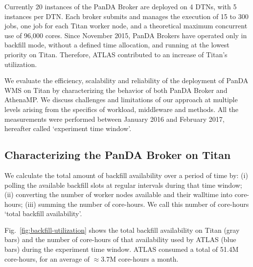\begin{enumerate}
\end{enumerate}
\fi

Currently 20 instances of the PanDA Broker are deployed on 4 DTNs, with
5 instances per DTN\@. Each broker submits and manages the execution of 15 to
300 jobs, one job for each Titan worker node, and a theoretical maximum
concurrent use of 96,000 cores. Since November 2015, PanDA Brokers have
operated only in backfill mode, without a defined time allocation, and
running at the lowest priority on Titan. Therefore, ATLAS contributed to an
increase of Titan's utilization.

We evaluate the efficiency, scalability and reliability of the deployment of
PanDA WMS on Titan by characterizing the behavior of both PanDA Broker and
AthenaMP\@. We discuss challenges and limitations of our approach at multiple
levels arising from the specifics of workload, middleware and methods. All
the measurements were performed between January 2016 and February 2017,
hereafter called `experiment time window'.

\subsection{Characterizing the PanDA Broker on Titan}\label{ssec:broker_titan}

We calculate the total amount of backfill availability over a period of time
by: (i) polling the available backfill slots at regular intervals during that
time window; (ii) converting the number of worker nodes available and their
walltime into core-hours; (iii) summing the number of core-hours. We call
this number of core-hours `total backfill availability'.

Fig.~\ref{fig:backfill-utilization} shows the total backfill availability on
Titan (gray bars) and the number of core-hours of that availability used by
ATLAS (blue bars) during the experiment time window. ATLAS consumed a total
of 51.4M core-hours, for an average of \(\approx\)3.7M core-hours a month.

